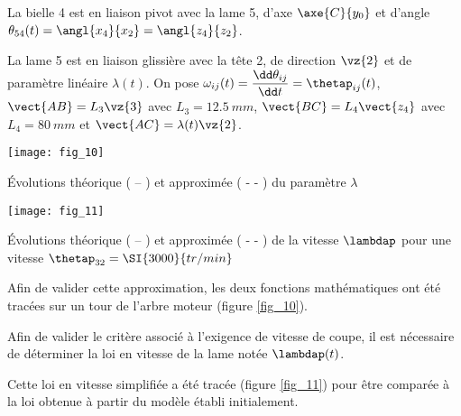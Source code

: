 La bielle 4 est en liaison pivot avec la lame 5, d’axe $\axe{C}{y_0}$ et d’angle $\theta_{54} (t)= \angl{x_4}{x_2} = \angl{z_4}{z_2} $.

La lame 5 est en liaison glissière avec la tête 2, de direction  $\vz{2}$ et de paramètre linéaire $\lambda(t)$.
On pose $\omega_{ij} (t)= \dfrac{\dd \theta_{ij}}{\dd t} = \thetap_{ij}(t)$, $\vect{AB}=L_3\vz{3}$ avec $L_3=\SI{12,5}{mm}$, $\vect{BC}=L_4 \vect{z_4}$  avec $L_4=\SI{80}{mm}$ et $\vect{AC}=\lambda(t)\vz{2}$.

\begin{marginfigure}
\texttt{[image: fig\_10]}
\caption{ Évolutions théorique ( -- ) et approximée ( - - ) du paramètre $\lambda$ \label{fig_10}}
\end{marginfigure}

\begin{marginfigure}
\texttt{[image: fig\_11]}
\caption{ Évolutions théorique ( -- ) et approximée ( - - ) de la vitesse $\lambdap$ pour une vitesse $\thetap_{32}=\SI{3000}{tr/min}$ \label{fig_11}}
\end{marginfigure}




Afin de valider cette approximation, les deux fonctions mathématiques ont été tracées sur un tour de l’arbre moteur (figure \ref{fig_10}).





Afin de valider le critère associé à l’exigence de vitesse de coupe, il est nécessaire de déterminer la loi en vitesse de la lame notée $\lambdap(t)$.


Cette loi en vitesse simplifiée a été tracée (figure \ref{fig_11}) pour être comparée à la loi obtenue à partir du modèle établi initialement.

